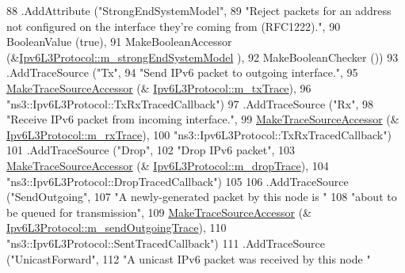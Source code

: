 \begin{DoxyCode}
88     .AddAttribute (\textcolor{stringliteral}{"StrongEndSystemModel"},
89                    \textcolor{stringliteral}{"Reject packets for an address not configured on the interface they're coming from
       (RFC1222)."},
90                    BooleanValue (\textcolor{keyword}{true}),
91                    MakeBooleanAccessor (&\hyperlink{classns3_1_1Ipv6L3Protocol_ac00aee071bc7ab2096efbf8fdc5e3814}{Ipv6L3Protocol::m\_strongEndSystemModel}
      ),
92                    MakeBooleanChecker ())
93     .AddTraceSource (\textcolor{stringliteral}{"Tx"},
94                      \textcolor{stringliteral}{"Send IPv6 packet to outgoing interface."},
95                      \hyperlink{group__tracing_gab21a770b9855af4e8f69f7531ea4a6b0}{MakeTraceSourceAccessor} (&
      \hyperlink{classns3_1_1Ipv6L3Protocol_a2037be8528273f3495216a09384e38e7}{Ipv6L3Protocol::m\_txTrace}),
96                      \textcolor{stringliteral}{"ns3::Ipv6L3Protocol::TxRxTracedCallback"})
97     .AddTraceSource (\textcolor{stringliteral}{"Rx"},
98                      \textcolor{stringliteral}{"Receive IPv6 packet from incoming interface."},
99                      \hyperlink{group__tracing_gab21a770b9855af4e8f69f7531ea4a6b0}{MakeTraceSourceAccessor} (&
      \hyperlink{classns3_1_1Ipv6L3Protocol_a2fc8b57fc958fccd7c708f8c8ca03da5}{Ipv6L3Protocol::m\_rxTrace}),
100                      \textcolor{stringliteral}{"ns3::Ipv6L3Protocol::TxRxTracedCallback"})
101     .AddTraceSource (\textcolor{stringliteral}{"Drop"},
102                      \textcolor{stringliteral}{"Drop IPv6 packet"},
103                      \hyperlink{group__tracing_gab21a770b9855af4e8f69f7531ea4a6b0}{MakeTraceSourceAccessor} (&
      \hyperlink{classns3_1_1Ipv6L3Protocol_ac22d2d63cac436267ae6cafc46880a6e}{Ipv6L3Protocol::m\_dropTrace}),
104                      \textcolor{stringliteral}{"ns3::Ipv6L3Protocol::DropTracedCallback"})
105 
106     .AddTraceSource (\textcolor{stringliteral}{"SendOutgoing"},
107                      \textcolor{stringliteral}{"A newly-generated packet by this node is "}
108                      \textcolor{stringliteral}{"about to be queued for transmission"},
109                      \hyperlink{group__tracing_gab21a770b9855af4e8f69f7531ea4a6b0}{MakeTraceSourceAccessor} (&
      \hyperlink{classns3_1_1Ipv6L3Protocol_aac1ff242aa91275202e37cf7d805eec8}{Ipv6L3Protocol::m\_sendOutgoingTrace}),
110                      \textcolor{stringliteral}{"ns3::Ipv6L3Protocol::SentTracedCallback"})
111     .AddTraceSource (\textcolor{stringliteral}{"UnicastForward"},
112                      \textcolor{stringliteral}{"A unicast IPv6 packet was received by this node "}

\end{DoxyCode}
